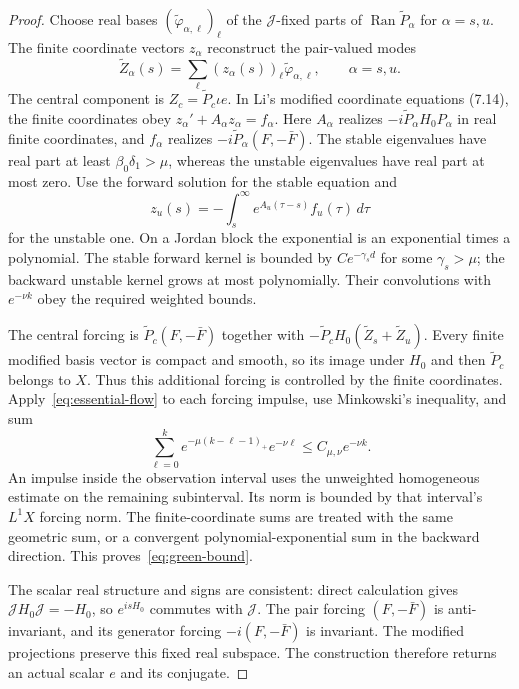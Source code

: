 \documentclass[11pt]{article}
\numberwithin{equation}{section}
\theoremstyle{remark}
\newcommand{\Pt}[1]{\widetilde P_{#1}}
\DeclareMathOperator{\Ran}{Ran}
\begin{document}
\begin{proof}
Choose real bases $(\widetilde\varphi_{\alpha,\ell})_\ell$ of the
$\mathcal J$-fixed parts of $\Ran\Pt\alpha$ for $\alpha=s,u$.
The finite coordinate vectors $z_\alpha$ reconstruct the pair-valued modes
\[
 \widetilde Z_\alpha(s)=\sum_\ell(z_\alpha(s))_\ell
                   \widetilde\varphi_{\alpha,\ell},\qquad \alpha=s,u.
\]
The central component is $Z_c=\Pt c\iota e$.
In Li's modified coordinate equations (7.14), the finite coordinates obey
$z_\alpha'+A_\alpha z_\alpha=f_\alpha$.
Here $A_\alpha$ realizes $-i\Pt\alpha H_0P_\alpha$ in real finite
coordinates, and $f_\alpha$ realizes $-i\Pt\alpha(F,-\bar F)$.
The stable eigenvalues have real part at least $\beta_0\delta_1>\mu$,
whereas the unstable eigenvalues have real part at most zero. Use the
forward solution for the stable equation and
\[
 z_u(s)=-\int_s^\infty e^{A_u(\tau-s)}f_u(\tau)\,d\tau
\]
for the unstable one. On a Jordan block the exponential is an exponential
times a polynomial. The stable forward kernel is bounded by
$Ce^{-\gamma_sd}$ for some $\gamma_s>\mu$; the backward unstable kernel
grows at most polynomially. Their convolutions with $e^{-\nu k}$ obey
the required weighted bounds.

The central forcing is $\Pt c(F,-\bar F)$ together with
$-\Pt cH_0(\widetilde Z_s+\widetilde Z_u)$. Every finite modified basis
vector is compact and smooth, so its image under $H_0$ and then $\Pt c$
belongs to $X$. Thus this additional forcing is controlled by the finite
coordinates. Apply~\eqref{eq:essential-flow} to each forcing impulse,
use Minkowski's inequality, and sum
\begin{equation}\label{eq:exponential-sum}
 \sum_{\ell=0}^k e^{-\mu(k-\ell-1)_+}e^{-\nu\ell}
                   \le C_{\mu,\nu}e^{-\nu k}.
\end{equation}
An impulse inside the observation interval uses the unweighted homogeneous
estimate on the remaining subinterval. Its norm is bounded by that
interval's $L^1X$ forcing norm. The finite-coordinate sums are treated
with the same geometric sum, or a convergent polynomial-exponential sum
in the backward direction. This proves~\eqref{eq:green-bound}.

The scalar real structure and signs are consistent: direct calculation
gives $\mathcal JH_0\mathcal J=-H_0$, so $e^{isH_0}$ commutes with
$\mathcal J$. The pair forcing $(F,-\bar F)$ is anti-invariant, and
its generator forcing $-i(F,-\bar F)$ is invariant. The modified
projections preserve this fixed real subspace. The construction therefore
returns an actual scalar $e$ and its conjugate.
\end{proof}
\end{document}
